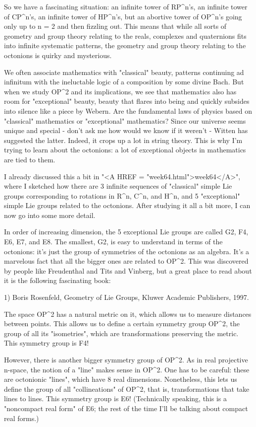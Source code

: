 So we have a fascinating situation: an infinite tower of RP^{n}'s, an
infinite tower of CP^{n}'s, an infinite tower of HP^{n}'s, but an abortive
tower of OP^{n}'s going only up to n = 2 and then fizzling out.  This
means that while all sorts of geometry and group theory relating to
the reals, complexes and quaternions fits into infinite systematic
patterns, the geometry and group theory relating to the octonions is
quirky and mysterious.

We often associate mathematics with "classical" beauty, patterns
continuing ad infinitum with the ineluctable logic of a composition by
some divine Bach.  But when we study OP^{2} and its implications, we see
that mathematics also has room for "exceptional" beauty, beauty that
flares into being and quickly subsides into silence like a piece by
Webern.  Are the fundamental laws of physics based on "classical"
mathematics or "exceptional" mathematics?  Since our universe seems
unique and special - don't ask me how would we know if it weren't
- Witten has suggested the latter.  Indeed, it crops up a lot in
string theory.  This is why I'm trying to learn about the octonions: a
lot of exceptional objects in mathematics are tied to them.

I already discussed this a bit in "<A HREF = "week64.html">week64</A>", where I sketched how there
are 3 infinite sequences of "classical" simple Lie groups corresponding
to rotations in R^{n}, C^{n}, and H^{n}, and 5 "exceptional" simple Lie groups
related to the octonions.   After studying it all a bit more, I can now
go into some more detail.  

In order of increasing dimension, the 5 exceptional Lie groups are
called G2, F4, E6, E7, and E8.  The smallest, G2, is easy to
understand in terms of the octonions: it's just the group of
symmetries of the octonions as an algebra.  It's a marvelous fact that
all the bigger ones are related to OP^{2}.  This was discovered by
people like Freudenthal and Tits and Vinberg, but a great place to
read about it is the following fascinating book:

1) Boris Rosenfeld, Geometry of Lie Groups, Kluwer Academic Publishers,
1997.

The space OP^{2} has a natural metric on it, which allows us to measure
distances between points.  This allows us to define a certain symmetry
group OP^{2}, the group of all its "isometries", which are
transformations preserving the metric.  This symmetry group is F4!

However, there is another bigger symmetry group of OP^{2}.
As in real projective n-space, the notion of a "line" makes
sense in OP^{2}.  One has to be careful: these are octonionic
"lines", which have 8 real dimensions.  Nonetheless, this lets
us define the group of all "collineations" of OP^{2},
that is, transformations that take lines to lines.  This symmetry group
is E6!  (Technically speaking, this is a "noncompact real
form" of E6; the rest of the time I'll be talking about compact
real forms.)


